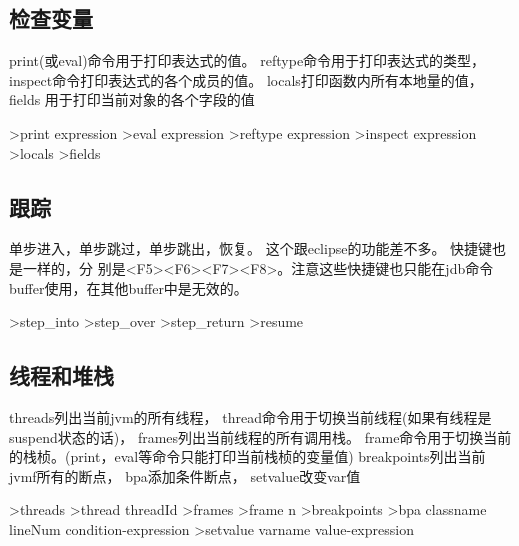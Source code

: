 \documentclass[oneside,openany]{book}
\begin{document}
  \subsection{检查变量}
    print(或eval)命令用于打印表达式的值。 reftype命令用于打印表达式的类型，
  inspect命令打印表达式的各个成员的值。 locals打印函数内所有本地量的值， fields
  用于打印当前对象的各个字段的值
    \begin{mdframed}[style=SmallFrame]
      \begin{flushleft}
      >print expression\newline
      >eval expression\newline
      >reftype expression\newline                      
      >inspect expression\newline                      
      >locals\newline                      
      >fields
      \end{flushleft}
    \end{mdframed}

  \subsection{跟踪}

    单步进入，单步跳过，单步跳出，恢复。 这个跟eclipse的功能差不多。 快捷键也是一样的，分
    别是<F5><F6><F7><F8>。注意这些快捷键也只能在jdb命令buffer使用，在其他buffer中是无效的。
    \begin{mdframed}[style=SmallFrame]
      \begin{flushleft}
      >step\_into\newline
      >step\_over\newline
      >step\_return\newline
      >resume           
      \end{flushleft}
    \end{mdframed}

    

  \subsection{线程和堆栈}
  threads列出当前jvm的所有线程， thread命令用于切换当前线程(如果有线程是suspend状态的话)，
  frames列出当前线程的所有调用栈。 frame命令用于切换当前的栈桢。(print，eval等命令只能打印当前栈桢的变量值)
  breakpoints列出当前jvmf所有的断点， bpa添加条件断点， setvalue改变var值
    \begin{mdframed}[style=SmallFrame]
      \begin{flushleft}
      >threads\newline
      >thread threadId\newline
      >frames\newline
      >frame n\newline
      >breakpoints\newline
      >bpa classname lineNum condition-expression\newline
      >setvalue  varname value-expression\newline
      \end{flushleft}
    \end{mdframed}
\end{document}
